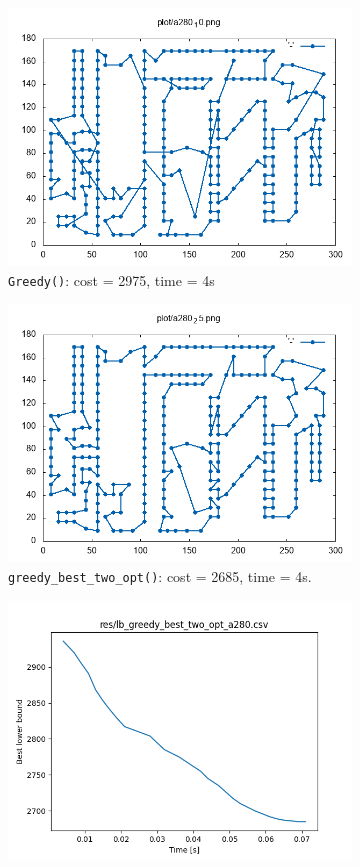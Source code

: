 \begin{figure}[!h]
	\begin{subfigure}{.5\columnwidth}
		\centering
		\includegraphics[width=0.9\columnwidth]{../res/a280_10.png}
		\caption{\texttt{Greedy()}: cost = 2975, time = 4s}
		\label{fig:a280_10}
	\end{subfigure}
	\begin{subfigure}{.5\columnwidth}
		\centering
		\includegraphics[width=0.9\columnwidth]{../res/a280_25.png}
		\caption{\texttt{greedy\_best\_two\_opt()}: cost = 2685, time = 4s.}
		\label{fig:a280_25}
	\end{subfigure}
	\begin{subfigure}{.5\columnwidth}
		\centering
		\includegraphics[width=0.9\columnwidth]{../res/lb_greedy_best_two_opt_a280.png}

\end{subfigure}
\end{figure}
